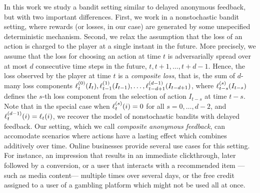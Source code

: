 In this work we study a bandit setting similar to delayed anonymous feedback, but with two important differences. First, we work in a nonstochastic bandit setting, where rewards (or losses, in our case) are generated by some unspecified deterministic mechanism.
Second, we relax the assumption that the loss of an action is charged to the player at a single instant in the future. More precisely, we assume that the loss for choosing an action at time $t$ is adversarially spread over at most $d$ consecutive time steps in the future, $t,t+1,\dots,t+d-1$.
Hence, the loss observed by the player at time $t$ is a \textsl{composite loss}, that is, the sum of $d$-many loss components $\ell_{t}^{(0)}(I_{t}),\ell_{t-1}^{(1)}(I_{t-1}),\dots,\ell_{t-d+1}^{(d-1)}(I_{t-d+1})$, where $\ell_{t-s}^{(s)}(I_{t-s})$ defines the $s$-th loss component from the selection of action $I_{t-s}$ at time $t-s$. Note that in the special case when $\ell_t^{(s)}(i) = 0$ for all $s = 0,\dots,d-2$, and $\ell_t^{(d-1)}(i) = \ell_t(i)$, we recover the model of nonstochastic bandits with delayed feedback. Our setting, which we call \textsl{composite anonymous feedback}, can accomodate scenarios where actions have a lasting effect which combines additively over time. Online businesses provide several use cases for this setting. For instance, an impression that results in an immediate clickthrough, later followed by a conversion, or a user that interacts with a recommended item ---such as media content--- multiple times over several days, or the free credit assigned to a user of a gambling platform which might not be used all at once.

